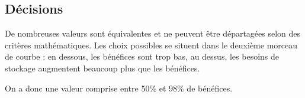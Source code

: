 \subsection{Décisions}
De nombreuses valeurs sont équivalentes et ne peuvent être départagées selon des
critères mathématiques. Les choix possibles se situent dans le deuxième morceau
de courbe : en dessous, les bénéfices sont trop bas, au dessus, les besoins de
stockage augmentent beaucoup plus que les bénéfices.

On a donc une valeur comprise entre 50\% et 98\% de bénéfices.
